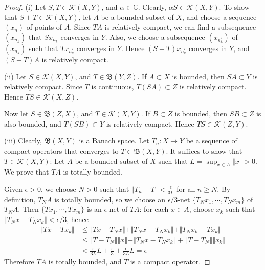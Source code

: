 \documentclass{article}
\begin{document}
\begin{proof}
(i) Let $S,T\in\mathcal{K}(X,Y)$, and $\alpha\in\mathbb{C}$. Clearly, $\alpha S\in\mathcal{K}(X,Y)$. To show that $S+T\in\mathcal{K}(X,Y)$, let $A$ be a bounded subset of $X$, and choose a sequence $(x_n)$ of points of $A$. Since $TA$ is relatively compact, we can find a subsequence $(x_{n_k})$ that $Sx_{n_k}$ converges in $Y$. Also, we choose a subsequence $(x_{n_k^\prime})$ of $(x_{n_k})$ such that $Tx_{n^\prime_k}$ converges in $Y$. Hence $\left(S+T\right)x_{n_k^\prime}$ converges in $Y$, and $(S+T)A$ is relatively compact.\vspace{0.1cm}

(ii) Let $S\in\mathcal{K}(X,Y)$, and $T\in\mathfrak{B}(Y,Z)$. If $A\subset X$ is bounded, then $SA\subset Y$ is relatively compact. Since $T$ is continuous, $T(SA)\subset Z$ is relatively compact. Hence $TS\in\mathcal{K}(X,Z)$.

Now let $S\in\mathfrak{B}(Z,X)$, and $T\in\mathcal{K}(X,Y)$. If $B\subset Z$ is bounded, then $SB\subset Z$ is also bounded, and $T(SB)\subset Y$ is relatively compact. Hence $TS\in\mathcal{K}(Z,Y)$.\vspace{0.1cm}

(iii) Clearly, $\mathfrak{B}(X,Y)$ is a Banach space. Let $T_n:X\to Y$ be a sequence of compact operators that converges to $T\in\mathfrak{B}(X,Y)$. It suffices to show that $T\in\mathcal{K}(X,Y)$: Let $A$ be a bounded subset of $X$ such that $L=\sup_{x\in A}\Vert x\Vert> 0$. We prove that $TA$ is totally bounded.

Given $\epsilon>0$, we choose $N>0$ such that $\Vert T_n - T\Vert <\frac{\epsilon}{3L}$ for all $n\geq N$. By definition, $T_NA$ is totally bounded, so we choose an $\epsilon/3$-net $\{T_Nx_1,\cdots,T_Nx_m\}$ of $T_NA$. Then $\{Tx_1,\cdots,Tx_m\}$ is an $\epsilon$-net of $TA$: for each $x\in A$, choose $x_k$ such that $\Vert T_Nx - T_Nx_k\Vert < \epsilon/3$, hence
\begin{align*}
	\Vert Tx - Tx_k\Vert &\leq \Vert Tx - T_N x\Vert + \Vert T_N x - T_N x_k\Vert + \Vert T_N x_k - Tx_k\Vert\\
	&\leq \left\Vert T-T_N\right\Vert\left\Vert x\right\Vert + \Vert T_N x - T_N x_k\Vert + \left\Vert T-T_N\right\Vert\left\Vert x_k\right\Vert\\
	&< \frac{\epsilon}{3L} L + \frac{\epsilon}{3} + \frac{\epsilon}{3L} L = \epsilon
\end{align*}
Therefore $TA$ is totally bounded, and $T$ is a compact operator.
\end{proof}
\end{document}
